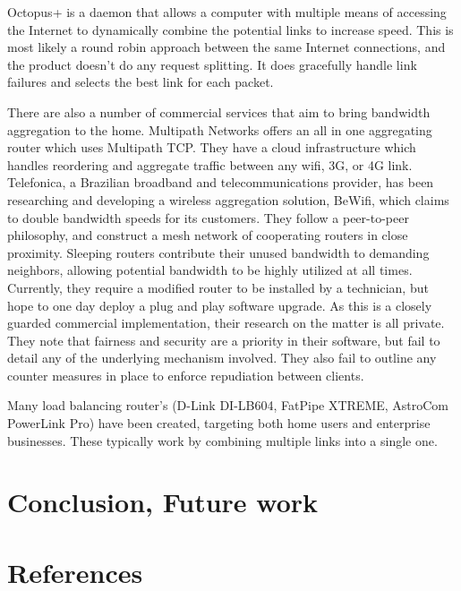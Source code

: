 \documentclass[12pt]{article}
\begin{document}
		Octopus+ is a daemon that allows a computer with multiple means of accessing the Internet to dynamically combine the potential links to increase speed. This is most likely a round robin approach between the same Internet connections, and the product doesn't do any request splitting. It does gracefully handle link failures and selects the best link for each packet.
		
		There are also a number of commercial services that aim to bring bandwidth aggregation to the home. Multipath Networks offers an all in one aggregating router which uses Multipath TCP. They have a cloud infrastructure which handles reordering and aggregate traffic between any wifi, 3G, or 4G link. Telefonica, a Brazilian broadband and telecommunications provider, has been researching and developing a wireless aggregation solution, BeWifi, which claims to double bandwidth speeds for its customers. They follow a peer-to-peer philosophy, and construct a mesh network of cooperating routers in close proximity. Sleeping routers contribute their unused bandwidth to demanding neighbors, allowing potential bandwidth to be highly utilized at all times. Currently, they require a modified router to be installed by a technician, but hope to one day deploy a plug and play software upgrade. As this is a closely guarded commercial implementation, their research on the matter is all private. They note that fairness and security are a priority in their software, but fail to detail any of the underlying mechanism involved. They also fail to outline any counter measures in place to enforce repudiation between clients. 
		
		Many load balancing router's (D-Link DI-LB604, FatPipe XTREME, AstroCom PowerLink Pro) have been created, targeting both home users and enterprise businesses. These typically work by combining multiple links into a single one. 




\newpage
\section{Conclusion, Future work}


\newpage
\section{References}
\end{document}
